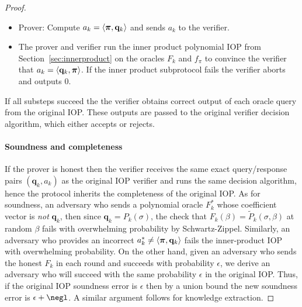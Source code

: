 \begin{proof}
\begin{itemize}
\begin{itemize}
 \item Prover: Compute $a_k = \langle \boldsymbol{\pi}, \mathbf{q}_k \rangle$ and sends $a_k$ to the verifier. 
 
 \item The prover and verifier run the inner product polynomial IOP from Section~\ref{sec:innerproduct} on the oracles $F_k$ and $f_\pi$ to convince the verifier that $a_k = \langle \mathbf{q}_k, \boldsymbol{\pi} \rangle$. If the inner product subprotocol fails the verifier aborts and outputs 0.  
 \end{itemize}
 
\end{itemize}

If all substeps succeed the the verifier obtains correct output of each oracle query from the original IOP. These outputs are passed to the original verifier decision algorithm, which either accepts or rejects. 

\paragraph{Soundness and completeness} If the prover is honest then the verifier receives the same exact query/response pairs $(\mathbf{q}_k, a_k)$ as the original IOP verifier and runs the same decision algorithm, hence the protocol inherits the completeness of the original IOP. As for soundness, an adversary who sends a polynomial oracle $F_k^*$ whose coefficient vector is \emph{not} $\mathbf{q}_k$, then since $\mathbf{q}_k = P_k(\sigma)$, the check that $F_k (\beta) = \tilde{P}_k(\sigma, \beta)$ at random $\beta$ fails with overwhelming probability by Schwartz-Zippel. Similarly, an adversary who provides an incorrect $a_k^* \neq \langle \boldsymbol{\pi}, \mathbf{q}_k \rangle$ fails the inner-product IOP with overwhelming probability. On the other hand, given an adversary who sends the honest $F_k$ in each round and succeeds with probability $\epsilon$, we derive an adversary who will succeed with the same probability $\epsilon$ in the original IOP. Thus, if the original IOP soundness error is $\epsilon$ then by a union bound the new soundness error is $\epsilon + \negl$. A similar argument follows for knowledge extraction.%


\end{proof}
